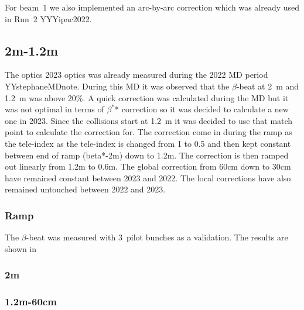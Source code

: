 \documentclass{cernatsnote}
\begin{document}
For beam~1 we also implemented an arc-by-arc correction which was already used in Run~2 YYYipac2022.

\subsection{2m-1.2m}
The optics 2023 optics was already measured during the 2022 MD period YYstephaneMDnote. During this MD it was observed that the $\beta$-beat at 2~m and 1.2~m was above 20\%. A quick correction was calculated during the MD but it was not optimal in terms of $\beta^*$* correction so it was decided to calculate a new one in 2023. Since the collisions start at 1.2~m it was decided to use that match point to calculate the correction for. The correction come in during the ramp as the tele-index as the tele-index is changed from 1 to 0.5 and then kept constant between end of ramp (beta*-2m) down to 1.2m. The correction is then ramped out linearly from 1.2m to 0.6m. The global correction from 60cm down to 30cm have remained constant between 2023 and 2022. The local corrections have also remained untouched between 2022 and 2023. 
\subsubsection{Ramp}
The $\beta$-beat was measured with 3~pilot bunches as a validation. The results are shown in 
\subsubsection{2m}
\subsubsection{1.2m-60cm}

\end{document}
